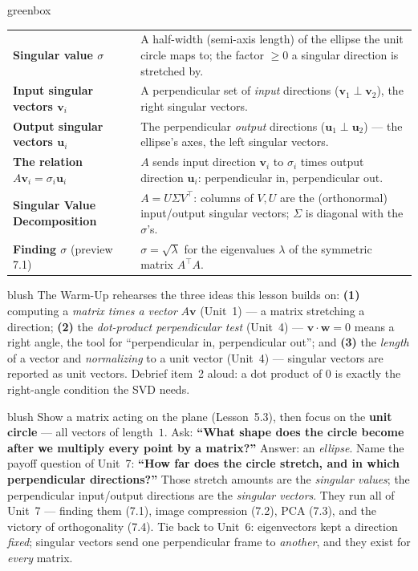 \documentclass[10pt]{article}
\newcommand{\uu}{\mathbf{u}}
\newcommand{\vv}{\mathbf{v}}
\newcommand{\ww}{\mathbf{w}}
\newcommand{\T}{^{\top}}
\begin{document}
\begin{skillbox}{greenbox}
\renewcommand{\arraystretch}{1.3}
\begin{tabularx}{\linewidth}{@{}l X@{}}
\textbf{Singular value $\sigma$} & A half-width (semi-axis length) of the ellipse the unit circle maps to; the factor $\ge0$ a singular direction is stretched by. \\
\textbf{Input singular vectors $\vv_i$} & A perpendicular set of \emph{input} directions ($\vv_1\perp\vv_2$), the right singular vectors. \\
\textbf{Output singular vectors $\uu_i$} & The perpendicular \emph{output} directions ($\uu_1\perp\uu_2$) --- the ellipse's axes, the left singular vectors. \\
\textbf{The relation $A\vv_i=\sigma_i\uu_i$} & $A$ sends input direction $\vv_i$ to $\sigma_i$ times output direction $\uu_i$: perpendicular in, perpendicular out. \\
\textbf{Singular Value Decomposition} & $A=U\Sigma V\T$: columns of $V,U$ are the (orthonormal) input/output singular vectors; $\Sigma$ is diagonal with the $\sigma$'s. \\
\textbf{Finding $\sigma$} (preview 7.1) & $\sigma=\sqrt{\lambda}$ for the eigenvalues $\lambda$ of the symmetric matrix $A\T A$. \\
\end{tabularx}
\end{skillbox}

\begin{fixedskillbox}{blush}
    The Warm-Up rehearses the three ideas this lesson builds on:
    \textbf{(1)} computing a \emph{matrix times a vector} $A\vv$ (Unit~1) --- a matrix stretching a
    direction; \textbf{(2)} the \emph{dot-product perpendicular test} (Unit~4) --- $\vv\cdot\ww=0$ means a
    right angle, the tool for ``perpendicular in, perpendicular out''; and \textbf{(3)} the \emph{length}
    of a vector and \emph{normalizing} to a unit vector (Unit~4) --- singular vectors are reported as unit
    vectors. Debrief item~2 aloud: a dot product of $0$ is exactly the right-angle condition the SVD needs.
\end{fixedskillbox}

\begin{skillbox}[Hook]{blush}
    Show a matrix acting on the plane (Lesson~5.3), then focus on the \textbf{unit circle} --- all vectors
    of length~$1$. Ask: \textbf{``What shape does the circle become after we multiply every point by a
    matrix?''} Answer: an \emph{ellipse}. Name the payoff question of Unit~7: \textbf{``How far does the
    circle stretch, and in which perpendicular directions?''} Those stretch amounts are the
    \emph{singular values}; the perpendicular input/output directions are the \emph{singular vectors}. They
    run all of Unit~7 --- finding them (7.1), image compression (7.2), PCA (7.3), and the victory of
    orthogonality (7.4). Tie back to Unit~6: eigenvectors kept a direction \emph{fixed}; singular vectors
    send one perpendicular frame to \emph{another}, and they exist for \emph{every} matrix.
\end{skillbox}
\end{document}
